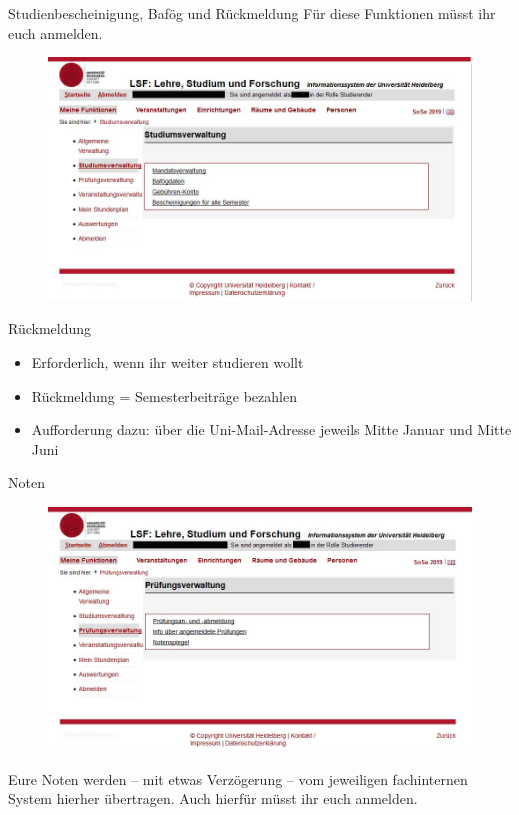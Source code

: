 \begin{frame}{Studienbescheinigung, Bafög und Rückmeldung}
    Für diese Funktionen müsst ihr euch anmelden.
    \begin{figure}
        \centering
        \includegraphics[scale=0.3]{images/lsf12.jpg}
    \end{figure}
\end{frame}

\begin{frame}{Rückmeldung}
    \begin{itemize}
        \item{Erforderlich, wenn ihr weiter studieren wollt}
        \item{Rückmeldung = Semesterbeiträge bezahlen}
        \item{Aufforderung dazu: über die Uni-Mail-Adresse jeweils Mitte Januar und Mitte Juni}
    \end{itemize}
\end{frame}

\begin{frame}{Noten}
    \begin{figure}
        \centering
        \includegraphics[scale=0.3]{images/lsf13.jpg}
    \end{figure}
    Eure Noten werden -- mit etwas Verzögerung -- vom jeweiligen fachinternen System hierher übertragen. Auch hierfür müsst ihr euch anmelden.
\end{frame}

